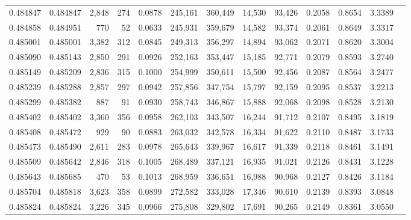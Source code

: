 \begin{tabular}{rrrrrrrrrrrrr}
0.484847 & 0.484847 & 2,848 &   274 &                                     0.0878 & 245,161 & 360,449 &  14,530 &  93,426 & 0.2058 & 0.8654 & 3.3389 \\
0.484858 & 0.484951 &   770 &    52 &                                     0.0633 & 245,931 & 359,679 &  14,582 &  93,374 & 0.2061 & 0.8649 & 3.3317 \\
0.485001 & 0.485001 & 3,382 &   312 &                                     0.0845 & 249,313 & 356,297 &  14,894 &  93,062 & 0.2071 & 0.8620 & 3.3004 \\
0.485090 & 0.485143 & 2,850 &   291 &                                     0.0926 & 252,163 & 353,447 &  15,185 &  92,771 & 0.2079 & 0.8593 & 3.2740 \\
0.485149 & 0.485209 & 2,836 &   315 &                                     0.1000 & 254,999 & 350,611 &  15,500 &  92,456 & 0.2087 & 0.8564 & 3.2477 \\
0.485239 & 0.485288 & 2,857 &   297 &                                     0.0942 & 257,856 & 347,754 &  15,797 &  92,159 & 0.2095 & 0.8537 & 3.2213 \\
0.485299 & 0.485382 &   887 &    91 &                                     0.0930 & 258,743 & 346,867 &  15,888 &  92,068 & 0.2098 & 0.8528 & 3.2130 \\
0.485402 & 0.485402 & 3,360 &   356 &                                     0.0958 & 262,103 & 343,507 &  16,244 &  91,712 & 0.2107 & 0.8495 & 3.1819 \\
0.485408 & 0.485472 &   929 &    90 &                                     0.0883 & 263,032 & 342,578 &  16,334 &  91,622 & 0.2110 & 0.8487 & 3.1733 \\
0.485473 & 0.485490 & 2,611 &   283 &                                     0.0978 & 265,643 & 339,967 &  16,617 &  91,339 & 0.2118 & 0.8461 & 3.1491 \\
0.485509 & 0.485642 & 2,846 &   318 &                                     0.1005 & 268,489 & 337,121 &  16,935 &  91,021 & 0.2126 & 0.8431 & 3.1228 \\
0.485643 & 0.485685 &   470 &    53 &                                     0.1013 & 268,959 & 336,651 &  16,988 &  90,968 & 0.2127 & 0.8426 & 3.1184 \\
0.485704 & 0.485818 & 3,623 &   358 &                                     0.0899 & 272,582 & 333,028 &  17,346 &  90,610 & 0.2139 & 0.8393 & 3.0848 \\
0.485824 & 0.485824 & 3,226 &   345 &                                     0.0966 & 275,808 & 329,802 &  17,691 &  90,265 & 0.2149 & 0.8361 & 3.0550 \\

\end{tabular}
